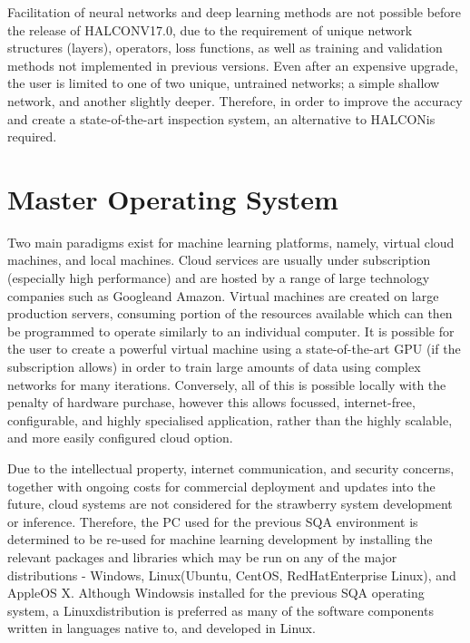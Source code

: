 \documentclass[fleqn,twoside,12pt]{report}
\begin{document}
Facilitation of neural networks and deep learning methods are not possible before the release of HALCON\texttrademark V17.0, due to the requirement of unique network structures (layers), operators, loss functions, as well as training and validation methods not implemented in previous versions. Even after an expensive upgrade, the user is limited to one of two unique, untrained networks; a simple shallow network, and another slightly deeper. Therefore, in order to improve the accuracy and create a state-of-the-art inspection system, an alternative to HALCON\texttrademark is required. 


\section{Master Operating System}

Two main paradigms exist for machine learning platforms, namely, virtual cloud machines, and local machines. Cloud services are usually under subscription (especially high performance) and are hosted by a range of large technology companies such as Google\textregistered and Amazon\textregistered. Virtual machines are created on large production servers, consuming portion of the resources available which can then be programmed to operate similarly to an individual computer. It is possible for the user to create a powerful virtual machine using a state-of-the-art GPU (if the subscription allows) in order to train large amounts of data using complex networks for many iterations. Conversely, all of this is possible locally with the penalty of hardware purchase, however this allows focussed, internet-free, configurable, and highly specialised application, rather than the highly scalable, and more easily configured cloud option. 

Due to the intellectual property, internet communication, and security concerns, together with ongoing costs for commercial deployment and updates into the future, cloud systems are not considered for the strawberry system development or inference. Therefore, the PC used for the previous SQA environment is determined to be re-used for machine learning development by installing the relevant packages and libraries which may be run on any of the major distributions - Windows\texttrademark, Linux\textregistered (Ubuntu\textregistered, CentOS\texttrademark, RedHat\textregistered Enterprise Linux\textregistered), and Apple\textregistered OS X\textregistered. Although Windows\texttrademark is installed for the previous SQA operating system, a Linux\textregistered distribution is preferred as many of the software components written in languages native to, and developed in Linux.
\end{document}
